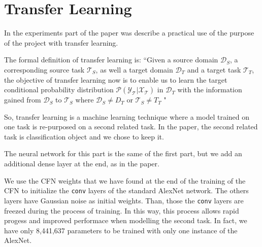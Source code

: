 \section{Transfer Learning}

In the experiments part of the paper was describe a practical use of the purpose of the project with transfer learning. 

The formal definition of transfer learning is: \textquotedblleft Given a source domain $\mathcal{D}_{S}$, a corresponding source task $\mathcal{T}_{S}$, as well a target domain $\mathcal{D}_{T}$ and a target task $\mathcal{T}_{T}$, the objective of transfer learning now is to enable us to learn the target conditional probability distribution $\mathcal{P(Y_{T}|X_{T})}$ in $\mathcal{D}_{T}$ with the information gained from $\mathcal{D}_{S}$ to $\mathcal{T}_{S}$ where $\mathcal{D}_{S} \neq {D}_{T}$ or $\mathcal{T}_{S} \neq {T}_{T}$ "

So, transfer learning is a machine learning technique where a model trained on one task is re-purposed on a second related task. In the paper, the second related task is classification object and we chose to keep it.

The neural network for this part is the same of the first part, but we add an additional dense layer at the end, as in the paper.

We use the CFN weights that we have found at the end of the training of the CFN to initialize the \texttt{conv} layers of the standard AlexNet network. The others layers have Gaussian noise as initial weights. Than, those the \texttt{conv} layers are freezed during the process of training. In this way, this process allows rapid progess and improved performace when modelling the second task. In fact, we have only 8,441,637 parameters to be trained with only one instance of the AlexNet.

